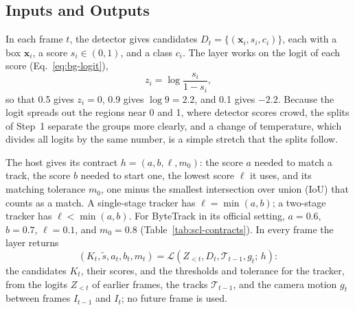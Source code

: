 \subsection{Inputs and Outputs}\label{sec:scl-problem}
In each frame $t$, the detector gives candidates $D_t=\{(\mathbf{x}_i,s_i,c_i)\}$, each with a box $\mathbf{x}_i$, a score $s_i\in(0,1)$, and a class $c_i$. The layer works on the logit of each score (Eq.~\eqref{eq:bg-logit}),
\begin{equation}
z_i=\log\frac{s_i}{1-s_i},
\label{eq:scl-logit}
\end{equation}
so that 0.5 gives $z_i=0$, 0.9 gives $\log 9=2.2$, and 0.1 gives $-2.2$. Because the logit spreads out the regions near 0 and 1, where detector scores crowd, the splits of Step~1 separate the groups more clearly, and a change of temperature, which divides all logits by the same number, is a simple stretch that the splits follow.

The host gives its contract $h=(a,b,\ell,m_0)$: the score $a$ needed to match a track, the score $b$ needed to start one, the lowest score $\ell$ it uses, and its matching tolerance $m_0$, one minus the smallest intersection over union (IoU) that counts as a match. A single-stage tracker has $\ell=\min(a,b)$; a two-stage tracker has $\ell<\min(a,b)$. For ByteTrack in its official setting, $a=0.6$, $b=0.7$, $\ell=0.1$, and $m_0=0.8$ (Table~\ref{tab:scl-contracts}). In every frame the layer returns
\begin{equation}
\left(K_t,\tilde{s},a_t,b_t,m_t\right)=
\mathcal{L}\left(Z_{<t},D_t,\mathcal{T}_{t-1},g_t;\,h\right):
\label{eq:scl-layer}
\end{equation}
the candidates $K_t$, their scores, and the thresholds and tolerance for the tracker, from the logits $Z_{<t}$ of earlier frames, the tracks $\mathcal{T}_{t-1}$, and the camera motion $g_t$ between frames $I_{t-1}$ and $I_t$; no future frame is used.

